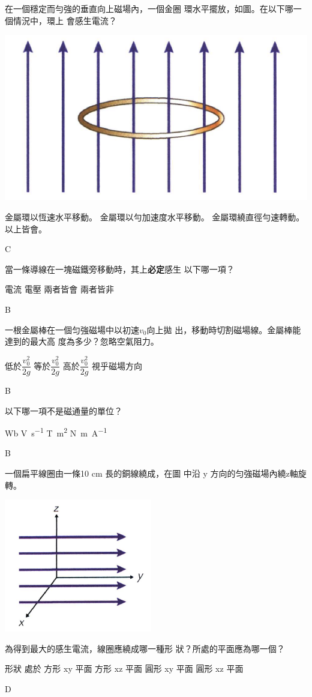 {
    在一個穩定而勻強的垂直向上磁場內，一個金圈 環水平擺放，如圖。在以下哪一個情況中，環上 會感生電流？
    \par{\par\centering\includegraphics[width=.3\textwidth]{./img/ch5_induction_mc_2024-06-24-17-18-21.png}\par}
    \begin{tasks}
        \task 金屬環以恆速水平移動。
        \task 金屬環以勻加速度水平移動。
        \task 金屬環繞直徑勻速轉動。
        \task 以上皆會。
    \end{tasks}
}{C}

{
    當一條導線在一塊磁鐵旁移動時，其上\textbf{必定}感生 以下哪一項？
    \begin{tasks}
        \task 電流
        \task 電壓
        \task 兩者皆會
        \task 兩者皆非
    \end{tasks}
}{B}

{
    一根金屬棒在一個匀強磁場中以初速$v_0$向上拋 出，移動時切割磁場線。金屬棒能達到的最大高 度為多少？忽略空氣阻力。
    \begin{tasks}
        \task 低於$\dfrac{v^2_0}{2g}$
        \task 等於$\dfrac{v^2_0}{2g}$
        \task 高於$\dfrac{v^2_0}{2g}$
        \task 視乎磁場方向
    \end{tasks}
}{B}

{
    以下哪一項不是磁通量的單位？
    \begin{tasks}
        \task \unit{Wb}
        \task \unit{V.s^{-1}}
        \task \unit{T.m^2}
        \task \unit{N.m.A^{-1}}
    \end{tasks}
}{B}

{
    一個扁平線圈由一條10 cm 長的銅線繞成，在圖 中沿 y 方向的匀強磁場內繞z軸旋轉。
    \par{\par\centering\includegraphics[width=.3\textwidth]{./img/ch5_induction_mc_2024-06-24-17-06-53.png}\par}
    為得到最大的感生電流，線圈應繞成哪一種形 狀？所處的平面應為哪一個？
    \begin{tasks}
        \task [] 形狀 \tab\tab 處於
        \task 方形 \tab\tab xy 平面
        \task 方形 \tab\tab xz 平面
        \task 圓形 \tab\tab xy 平面
        \task 圓形 \tab\tab xz 平面
    \end{tasks}
}{D}

